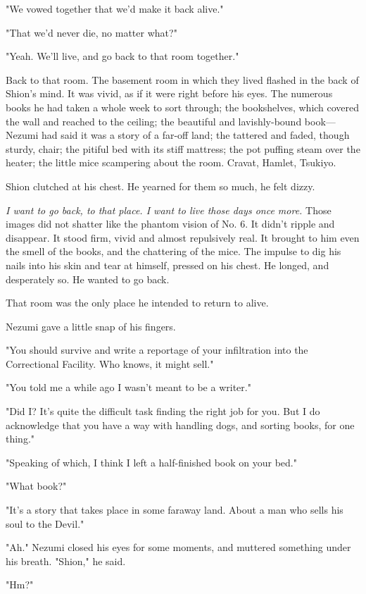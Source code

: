 "We vowed together that we'd make it back alive."

"That we'd never die, no matter what?"

"Yeah. We'll live, and go back to that room together."

Back to that room. The basement room in which they lived flashed in the
back of Shion's mind. It was vivid, as if it were right before his eyes.
The numerous books he had taken a whole week to sort through; the
bookshelves, which covered the wall and reached to the ceiling; the
beautiful and lavishly-bound book---Nezumi had said it was a story of a
far-off land; the tattered and faded, though sturdy, chair; the pitiful
bed with its stiff mattress; the pot puffing steam over the heater; the
little mice scampering about the room. Cravat, Hamlet, Tsukiyo.

Shion clutched at his chest. He yearned for them so much, he felt dizzy.

\emph{I want to go back, to that place. I want to live those days once more.}
Those images did not shatter like the phantom vision of No. 6. It didn't
ripple and disappear. It stood firm, vivid and almost repulsively real.
It brought to him even the smell of the books, and the chattering of the
mice. The impulse to dig his nails into his skin and tear at himself,
pressed on his chest. He longed, and desperately so. He wanted to go
back.

That room was the only place he intended to return to alive.

Nezumi gave a little snap of his fingers.

"You should survive and write a reportage of your infiltration into the
Correctional Facility. Who knows, it might sell."

"You told me a while ago I wasn't meant to be a writer."

"Did I? It's quite the difficult task finding the right job for you. But
I do acknowledge that you have a way with handling dogs, and sorting
books, for one thing."

"Speaking of which, I think I left a half-finished book on your bed."

"What book?"

"It's a story that takes place in some faraway land. About a man who
sells his soul to the Devil."

"Ah." Nezumi closed his eyes for some moments, and muttered something
under his breath. "Shion," he said.

"Hm?"

